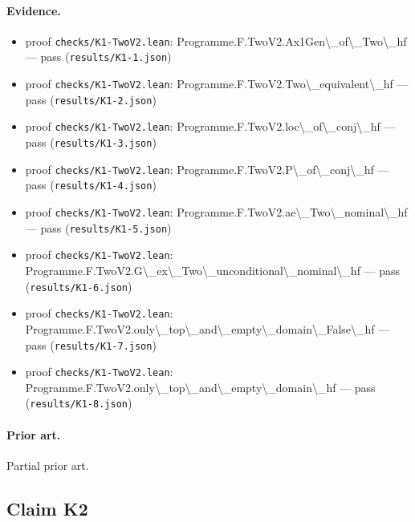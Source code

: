 \documentclass{article}
\begin{document}
\paragraph{Evidence.}
\begin{itemize}
\item proof \texttt{checks/K1-TwoV2.lean}: Programme.F.TwoV2.Ax1Gen\textbackslash{}\_of\textbackslash{}\_Two\textbackslash{}\_hf --- pass (\texttt{results/K1-1.json})
\item proof \texttt{checks/K1-TwoV2.lean}: Programme.F.TwoV2.Two\textbackslash{}\_equivalent\textbackslash{}\_hf --- pass (\texttt{results/K1-2.json})
\item proof \texttt{checks/K1-TwoV2.lean}: Programme.F.TwoV2.loc\textbackslash{}\_of\textbackslash{}\_conj\textbackslash{}\_hf --- pass (\texttt{results/K1-3.json})
\item proof \texttt{checks/K1-TwoV2.lean}: Programme.F.TwoV2.P\textbackslash{}\_of\textbackslash{}\_conj\textbackslash{}\_hf --- pass (\texttt{results/K1-4.json})
\item proof \texttt{checks/K1-TwoV2.lean}: Programme.F.TwoV2.ae\textbackslash{}\_Two\textbackslash{}\_nominal\textbackslash{}\_hf --- pass (\texttt{results/K1-5.json})
\item proof \texttt{checks/K1-TwoV2.lean}: Programme.F.TwoV2.G\textbackslash{}\_ex\textbackslash{}\_Two\textbackslash{}\_unconditional\textbackslash{}\_nominal\textbackslash{}\_hf --- pass (\texttt{results/K1-6.json})
\item proof \texttt{checks/K1-TwoV2.lean}: Programme.F.TwoV2.only\textbackslash{}\_top\textbackslash{}\_and\textbackslash{}\_empty\textbackslash{}\_domain\textbackslash{}\_False\textbackslash{}\_hf --- pass (\texttt{results/K1-7.json})
\item proof \texttt{checks/K1-TwoV2.lean}: Programme.F.TwoV2.only\textbackslash{}\_top\textbackslash{}\_and\textbackslash{}\_empty\textbackslash{}\_domain\textbackslash{}\_hf --- pass (\texttt{results/K1-8.json})
\end{itemize}

\paragraph{Prior art.} Partial prior art.

\subsection*{Claim K2}
\end{document}
